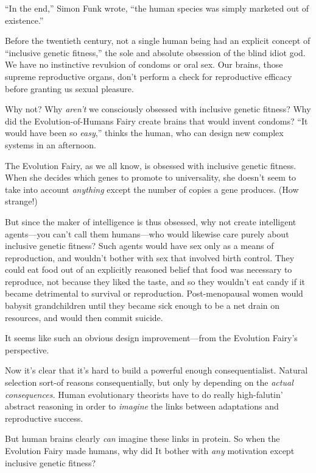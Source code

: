  ``In the end,'' Simon Funk
wrote, ``the human species was simply marketed out of
existence.''

\myendsectiontext



 Before the twentieth century, not a single human being had an
explicit concept of ``inclusive genetic
fitness,'' the sole and absolute obsession of the
blind idiot god. We have no instinctive revulsion of condoms or oral
sex. Our brains, those supreme reproductive organs,
don't perform a check for reproductive efficacy before
granting us sexual pleasure. 


 Why not? Why \textit{aren't} we consciously
obsessed with inclusive genetic fitness? Why did the
Evo\-lu\-tion-of-Hu\-mans Fairy create brains that would invent condoms?
``It would have been so
\textit{easy},'' thinks the human, who can design new
complex systems in an afternoon.


 The Evolution Fairy, as we all know, is obsessed with inclusive
genetic fitness. When she decides which genes to promote to
universality, she doesn't seem to take into account
\textit{anything} except the number of copies a gene produces. (How
strange!)


 But since the maker of intelligence is thus obsessed, why not
create intelligent agents---you can't call them
humans---who would likewise care purely about inclusive genetic
fitness? Such agents would have sex only as a means of reproduction,
and wouldn't bother with sex that involved birth
control. They could eat food out of an explicitly reasoned belief that
food was necessary to reproduce, not because they liked the taste, and
so they wouldn't eat candy if it became detrimental to
survival or reproduction. Post-menopausal women would babysit
grandchildren until they became sick enough to be a net drain on
resources, and would then commit suicide.


 It seems like such an obvious design improvement---from the
Evolution Fairy's perspective.


 Now it's clear that it's hard to
build a powerful enough consequentialist. Natural selection sort-of
reasons consequentially, but only by depending on the \textit{actual
consequences.} Human evolutionary theorists have to do really
high-falutin' abstract reasoning in order to
\textit{imagine} the links between adaptations and reproductive
success.


 But human brains clearly \textit{can} imagine these links in
protein. So when the Evolution Fairy made humans, why did It bother
with \textit{any} motivation except inclusive genetic fitness?


